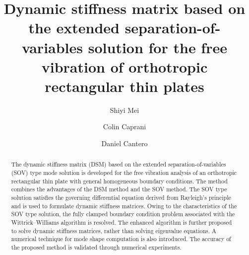 \documentclass[preprint,12pt]{elsarticle}
\begin{document}
\begin{frontmatter}
\title{Dynamic stiffness matrix based on the extended separation-of-variables solution for the free vibration of orthotropic rectangular thin plates}
\author[1]{Shiyi Mei}
\author[1]{Colin Caprani}
\author[2]{Daniel Cantero}
\begin{abstract}
The dynamic stiffness matrix (DSM) based on the extended separation-of-variables (SOV) type mode solution is developed for the free vibration analysis of an orthotropic rectangular thin plate with general homogeneous boundary conditions.  
The method combines the advantages of the DSM method and the SOV method.
The SOV type solution satisfies the governing differential equation derived from Rayleigh’s principle and is used to formulate dynamic stiffness matrices.
Owing to the characteristics of the SOV type solution, the fully clamped boundary condition problem associated with the Wittrick–Williams algorithm is resolved. 
The enhanced algorithm is further proposed to solve dynamic stiffness matrices, rather than solving eigenvalue equations.
A numerical technique for mode shape computation is also introduced.
The accuracy of the proposed method is validated through numerical experiments.
  
\end{abstract}
\end{frontmatter}
\linenumbers
\end{document}
